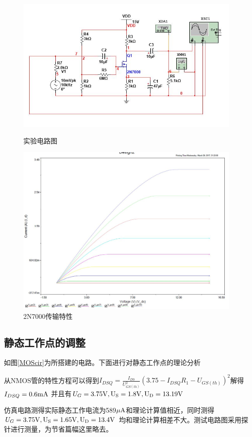 \documentclass[UTF8,a4paper]{ctexart}
\begin{document}
\begin{figure}
\centering
\includegraphics[width=\textwidth]{2-3.jpg}
\caption{实验电路图}
\label{MOScir}
\includegraphics[width=\textwidth]{2-2.jpg}
\caption{2N7000传输特性}
\label{whole} 
\end{figure}
\subsection{静态工作点的调整}
如图\ref{MOScir}为所搭建的电路。下面进行对静态工作点的理论分析

从NMOS管的特性方程可以得到$I_{DSQ}=\frac{I_{D0}}{U_{GS(th)}^2}(3.75-I_{DSQ}R_1-U_{GS(th)})^2$解得$I_{DSQ}=0.6\rm{mA}$
并且有$U_G=3.75\rm{V},U_S=1.8\rm{V},U_D=13.19\rm{V}$

仿真电路测得实际静态工作电流为589$\mu\rm{A}$和理论计算值相近，同时测得$U_G=3.75\rm{V},U_S=1.65\rm{V},U_D=13.4\rm{V}$
均和理论计算相差不大。测试电路图采用探针进行测量，为节省篇幅这里略去。
\end{document}
